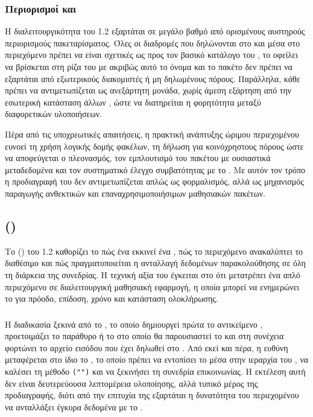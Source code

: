 \subsubsection{Περιορισμοί και  }

Η διαλειτουργικότητα του  1.2 εξαρτάται σε μεγάλο βαθμό από ορισμένους αυστηρούς περιορισμούς πακεταρίσματος. Όλες οι διαδρομές που δηλώνονται στο  και μέσα στο περιεχόμενο πρέπει να είναι σχετικές ως προς τον βασικό κατάλογο του , το \texttt{} οφείλει να βρίσκεται στη ρίζα του  με ακριβώς αυτό το όνομα και το πακέτο δεν πρέπει να εξαρτάται από εξωτερικούς διακομιστές ή μη δηλωμένους πόρους. Παράλληλα, κάθε  πρέπει να αντιμετωπίζεται ως ανεξάρτητη μονάδα, χωρίς άμεση εξάρτηση από την εσωτερική κατάσταση άλλων , ώστε να διατηρείται η φορητότητα μεταξύ διαφορετικών  υλοποιήσεων.

Πέρα από τις υποχρεωτικές απαιτήσεις, η πρακτική ανάπτυξης ώριμου περιεχομένου ευνοεί τη χρήση λογικής δομής φακέλων, τη δήλωση  για κοινόχρηστους πόρους ώστε να αποφεύγεται ο πλεονασμός, τον εμπλουτισμό του πακέτου με ουσιαστικά μεταδεδομένα και τον συστηματικό έλεγχο συμβατότητας με το . Με αυτόν τον τρόπο η προδιαγραφή του  δεν αντιμετωπίζεται απλώς ως φορμαλισμός, αλλά ως μηχανισμός παραγωγής ανθεκτικών και επαναχρησιμοποιήσιμων μαθησιακών πακέτων.

\subsection{  ()}
\label{subsec:scorm12_rte}

Το   () του  1.2 καθορίζει το πώς ένα  εκκινεί ένα , πώς το περιεχόμενο ανακαλύπτει το διαθέσιμο  και πώς πραγματοποιείται η ανταλλαγή δεδομένων παρακολούθησης σε όλη τη διάρκεια της συνεδρίας. Η τεχνική αξία του  έγκειται στο ότι μετατρέπει ένα απλό  περιεχόμενο σε διαλειτουργική μαθησιακή εφαρμογή, η οποία μπορεί να ενημερώνει το  για πρόοδο, επίδοση, χρόνο και κατάσταση ολοκλήρωσης.

\subsubsection{ }

Η διαδικασία  ξεκινά από το , το οποίο δημιουργεί πρώτα το αντικείμενο , προετοιμάζει το παράθυρο ή το  στο οποίο θα παρουσιαστεί το  και στη συνέχεια φορτώνει το αρχείο εισόδου που έχει δηλωθεί στο . Από εκεί και πέρα, η ευθύνη μεταφέρεται στο ίδιο το , το οποίο πρέπει να εντοπίσει το  μέσα στην ιεραρχία του , να καλέσει τη μέθοδο \texttt{("")} και να ξεκινήσει τη συνεδρία επικοινωνίας. Η εκτέλεση αυτή δεν είναι δευτερεύουσα λεπτομέρεια υλοποίησης, αλλά τυπικό μέρος της προδιαγραφής, διότι από την επιτυχία της εξαρτάται η δυνατότητα του περιεχομένου να ανταλλάξει έγκυρα δεδομένα με το .

